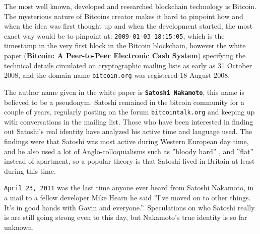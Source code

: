 The most well known, developed and researched blockchain technology is Bitcoin. 
The mysterious nature of Bitcoins creator makes it hard to pinpoint how
and when the idea was first thought up and when the development started, the
most exact way would be to pinpoint at:
\texttt{2009-01-03 18:15:05}\cite{genesis}, which is the timestamp in the very
first block in the Bitcoin blockchain, however the white paper (\textbf{Bitcoin:
A Peer-to-Peer Electronic Cash System})\cite{nakamoto_bitcoin} specifying the
technical details circulated on cryptographic mailing lists as early as 31
October 2008, and the domain name \texttt{bitcoin.org} was registered 18 August
2008.\cite{bernard_2018}


The author name given in the white paper is \textbf{\texttt{Satoshi Nakamoto}},
this name is believed to be a pseudonym. Satoshi remained in the bitcoin
community for a couple of years, regularly posting on the forum
\texttt{bitcointalk.org} and keeping up with conversations in the mailing list.
Those who have been interested in finding out Satoshi's real identity have
analyzed his active time and language used. The findings were that Satoshi was
most active during Western European day time, and he also used a lot of
Anglo-colloquialisms such as ''bloody hard'' \cite{nakamoto_bloody}, and
''flat'' instead of apartment, so a popular theory is that Satoshi lived in
Britain at least during this time.\cite{bernard_2018}

\texttt{April 23, 2011} was the last time anyone ever heard from Satoshi
Nakamoto, in a mail to a fellow developer Mike Hearn he said ''I've moved on to
other things.  It's in good hands with Gavin and everyone.''.\cite{nakamoto_last_mail}
Speculations on who Satoshi really is are still going strong even to this day, but
Nakamoto's true identity is so far unknown.\cite{bernard_2018}\cite{jeffries_2013}
